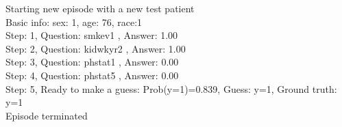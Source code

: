 \documentclass[reqno,11pt]{article}
\begin{document}
\noindent Starting new episode with a new test patient \\ [0.5ex] 
Basic info: sex: 1, age: 76, race:1 \\ [0.5ex] 
Step: 1, Question:  smkev1 , Answer: 1.00 \\ [0.5ex] 
Step: 2, Question:  kidwkyr2 , Answer: 1.00 \\ [0.5ex] 
Step: 3, Question:  phstat1 , Answer: 0.00 \\ [0.5ex] 
Step: 4, Question:  phstat5 , Answer: 0.00 \\ [0.5ex] 
Step: 5, Ready to make a guess: Prob(y=1)=0.839, Guess: y=1, Ground truth: y=1 \\ [0.5ex] 
Episode terminated \\ [0.5ex] 
\end{document}

